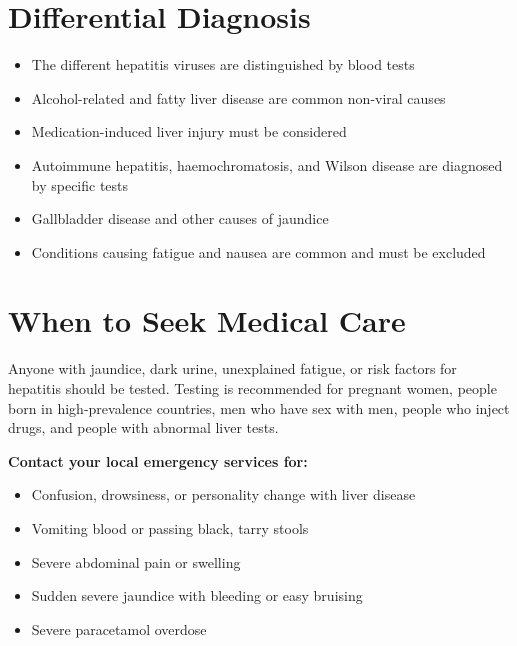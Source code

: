 \section*{Differential Diagnosis}
\begin{itemize}
    \item The different hepatitis viruses are distinguished by blood tests
    \item Alcohol-related and fatty liver disease are common non-viral causes
    \item Medication-induced liver injury must be considered
    \item Autoimmune hepatitis, haemochromatosis, and Wilson disease are diagnosed by specific tests
    \item Gallbladder disease and other causes of jaundice
    \item Conditions causing fatigue and nausea are common and must be excluded
\end{itemize}

\section*{When to Seek Medical Care}
Anyone with jaundice, dark urine, unexplained fatigue, or risk factors for hepatitis should be tested. Testing is recommended for pregnant women, people born in high-prevalence countries, men who have sex with men, people who inject drugs, and people with abnormal liver tests.

\textbf{Contact your local emergency services for:}
\begin{itemize}
    \item Confusion, drowsiness, or personality change with liver disease
    \item Vomiting blood or passing black, tarry stools
    \item Severe abdominal pain or swelling
    \item Sudden severe jaundice with bleeding or easy bruising
    \item Severe paracetamol overdose
\end{itemize}

